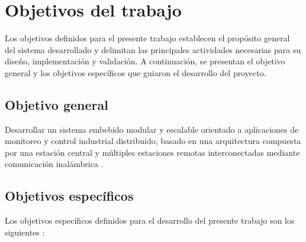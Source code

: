 
\section{Objetivos del trabajo}

Los objetivos definidos para el presente trabajo establecen el propósito general del sistema desarrollado y delimitan las principales actividades necesarias para su diseño, implementación y validación. A continuación, se presentan el objetivo general y los objetivos específicos que guiaron el desarrollo del proyecto.

\subsection{Objetivo general}
Desarrollar un sistema embebido modular y escalable orientado a aplicaciones de monitoreo y control industrial distribuido, basado en una arquitectura compuesta por una estación central y múltiples estaciones remotas interconectadas mediante comunicación inalámbrica \cite{proyecto}.

\subsection{Objetivos específicos}
Los objetivos específicos definidos para el desarrollo del presente trabajo son los siguientes \cite{proyecto}:

